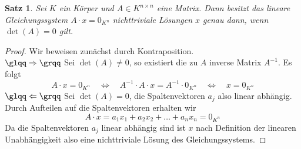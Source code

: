 \documentclass[a4paper,oneside, 11pt, openany%
]{article}
\theoremstyle{custom}
\newtheorem{proposition}[theorem]{Satz}
\theoremstyle{custom}
\begin{document}
	

	\begin{proposition}\label{prop:LGS}
		Sei $K$ ein Körper und $A \in K^{n \times n}$ eine Matrix. 
		Dann besitzt das lineare Gleichungssystem $A\cdot x = 0_{K^{n}}$ nichttriviale Lösungen $x$ genau dann, wenn $\det(A)=0$ gilt.
	\end{proposition}
	\begin{proof}Wir beweisen zunächst durch Kontraposition.\\
		${\glqq \Rightarrow \grqq}$ Sei $\det(A)\neq0$, so existiert die zu $A$ inverse Matrix $A^{-1}$. Es folgt
		\begin{equation*}
			A\cdot x = 0_{K^{n}} \quad \Leftrightarrow \quad A^{-1}\cdot A \cdot x = A^{-1}\cdot 0_{K^{n}} \quad \Leftrightarrow\quad  x = 0_{K^{n}}
		\end{equation*}
		${\glqq \Leftarrow \grqq}$ Sei $\det(A)=0$, die Spaltenvektoren $a_{j}$ also linear abhängig. Durch Aufteilen auf die Spaltenvektoren erhalten wir
		\begin{equation*}
			A\cdot x = a_{1}x_1+a_{2}x_2+\ldots+a_{n}x_n=0_{K^{n}}
		\end{equation*}
		Da die Spaltenvektoren $a_{j}$ linear abhängig sind ist $x$ nach Definition der linearen Unabhängigkeit also eine nichttriviale Lösung des Gleichungssystems.
	\end{proof}
	
\end{document}
